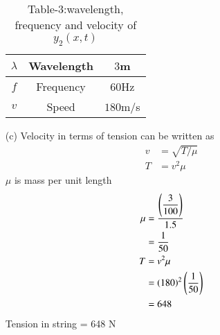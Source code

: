 \documentclass[journal,12pt,twocolumn]{IEEEtran}
\theoremstyle{remark}
\begin{document}
\begin{enumerate}
\begin{table}[h]
\begin{tabular}{|c|c|c|}
    \hline
    $\lambda$ & Wavelength & $3$m\\
    \hline
    $f$ & Frequency & $60$Hz \\
    \hline
    $v$ & Speed & $180$m/s\\
    \hline
  \end{tabular}
  \caption{Table-3:wavelength, frequency and velocity of $y_2(x,t)$}
  \label{tab:mytable2}
\end{table}
\item[(c)] Velocity in terms of tension can be written as
\begin{align}
v&=\sqrt{T/\mu}\\
T&=v^2\mu
\end{align}
$\mu$ is mass per unit length
\begin{align}
\mu&=\dfrac{\left(\dfrac{3}{100}\right)}{1.5}\\
&=\dfrac{1}{50}\\
T&=v^2\mu\\
&=\left(180\right)^2\left(\dfrac{1}{50}\right)\\
&=648
\end{align}
Tension in string = 648 N
\end{enumerate}
\end{document}
